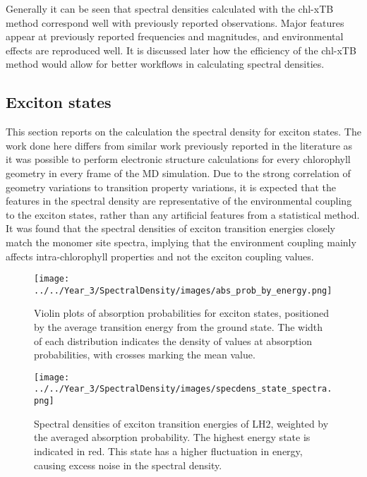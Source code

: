 Generally it can be seen that spectral densities calculated with the chl-xTB method
correspond well with previously reported observations. Major features appear at
previously reported frequencies and magnitudes, and environmental effects are reproduced
well. It is discussed later how the efficiency of the chl-xTB method would allow
for better workflows in calculating spectral densities.

\afterpartskip
\subsection{Exciton states}
\label{subsec:states}

This section reports on the calculation the spectral density for exciton states.
The work done here differs from similar work previously reported in the literature
as it was possible to perform electronic structure calculations for every chlorophyll
geometry in every frame of the MD simulation. Due to the strong correlation of geometry
variations to \Qy transition property variations, it is expected that the features 
in the spectral density are representative of the environmental coupling to the 
exciton states, rather than any artificial features from a statistical method. It
was found that the spectral densities of exciton transition energies closely match
the monomer site spectra, implying that the environment coupling mainly affects
intra-chlorophyll properties and not the exciton coupling values.

\begin{figure}
    \centering
    \texttt{[image: ../../Year\_3/SpectralDensity/images/abs\_prob\_by\_energy.png]}
    \label{fig:absorption_probabilities}
    \caption{Violin plots of absorption probabilities for exciton states, positioned
    by the average transition energy from the ground state. The width of each distribution 
    indicates the density of values at absorption probabilities, with crosses marking
    the mean value.}
\end{figure}

\begin{figure}
    \centering
    \texttt{[image: ../../Year\_3/SpectralDensity/images/specdens\_state\_spectra.png]}
    \label{fig:specdens_states}
    \caption{Spectral densities of exciton transition energies of LH2, weighted by
    the averaged absorption probability. The highest energy state is indicated in 
    red. This state has a higher fluctuation in energy, causing excess noise in
    the spectral density.}
\end{figure}

